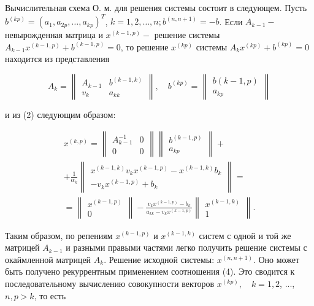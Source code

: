 \documentclass[10pt]{article}
\begin{document}
Вычислительная схема О. м. для решения системы состоит в следующем. Пусть $b^{(k p)}=\left(a_{1}, a_{2 p}, \ldots, a_{k p}\right)^{T}$, $k=1,2, \ldots, n ; b^{(n, n+1)}=-b$. Если $A_{k-1}-$ невырожденная матрица и $x^{(k-1, p)}-$ решение системы $A_{k-1} x^{(k-1, p)}+b^{(k-1, p)}=0$, то решение $x^{(k p)}$ системы $A_{k} x^{(k p)}+b^{(k p)}=0$ находится из представления

\[
A_{k}=\left\|\begin{array}{cc}
A_{k-1} & b^{(k-1, k)} \\
v_{k} & a_{k k}
\end{array}\right\|, \quad b^{(k p)}=\left\|\begin{array}{c}
b(k-1, p) \\
a_{k p}
\end{array}\right\|
\]

и из (2) следующим образом:

\[
\begin{gathered}
x^{(k, p)}=\left\|\begin{array}{cc}
A_{k-1}^{-1} & 0 \\
0 & 0
\end{array}\right\|\left\|\begin{array}{c}
b^{(k-1, p)} \\
a_{k p}
\end{array}\right\|+ \\
+\frac{1}{\alpha_{k}}\left\|\begin{array}{c}
x^{(k-1, k)} v_{k} x^{(k-1, p)}-x^{(k-1, k)} b_{k} \\
-v_{k} x^{(k-1, p)}+b_{k}
\end{array}\right\|= \\
=\left\|\begin{array}{c}
x^{(k-1, p)} \\
0
\end{array}\right\|-\frac{v_{k} x^{(k-1, p)}-b_{k}}{a_{k k}-v_{k} x^{(k-1, p)}}\left\|\begin{array}{c}
x^{(k-1, k)} \\
1
\end{array}\right\| .
\end{gathered}
\]

Таким образом, по репениям $x^{(k-1, p)}$ и $x^{(k-1, k)}$ систем с одной и той же матрицей $A_{k-1}$ и разными правыми частями легко получить решение системы с окаймленной матрицей $A_{k}$. Решение исходной системы: $x^{(n, n+1)}$. Оно может быть получено рекуррентным применением соотношения (4). Это сводится к последовательному вычислению совокупности векторов $x^{(k p)}, \quad k=1,2$, ..., $n, p>k$, то есть
\end{document}
